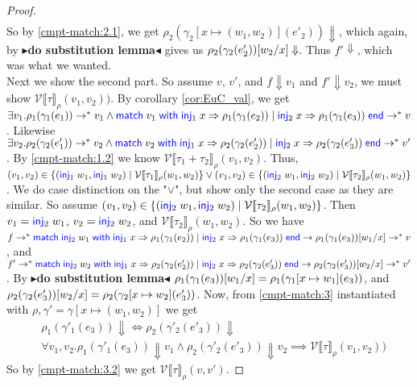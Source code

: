 \documentclass[twoside,11pt,openright]{report}
\theoremstyle{definition}
\newcommand{\Keyword}[1]{{\color{blue} \mathsf{#1}}}
\newcommand{\var}{x}
\newcommand{\expr}{e}
\newcommand{\val}{v}
\newcommand{\valB}{w}
\newcommand{\Inj}[1]{\Keyword{inj}_{#1}\;}
\newcommand{\MatchCmd}{\Keyword{match}}
\newcommand{\WithCmd}{\Keyword{with}}
\newcommand{\EndCmd}{\Keyword{end}}
\def\Match#1with#2=>#3|#4=>#5end{\MatchCmd{}\;#1\;\WithCmd{}\;#2\Rightarrow#3 \;|\;#4\Rightarrow#5\;\EndCmd{}}
\newcommand{\subst}[3]{#1{\left[#3 \middle/ #2 \right]}}
\newcommand{\Tsum}[2]{#1 + #2}
\newcommand{\typ}{\tau}
\newcommand{\step}{\rightarrow}
\newcommand{\stepS}{\rightarrow^*}
\newcommand{\ValInp}[2]{\mathcal{V} \llbracket #1 \rrbracket_{#2}}
\newcommand{\ValInpGen}[2]{\ValInp{#1}{#2}(\val_1, \val_2)}
\newcommand{\map}[2]{#1 \mapsto #2}
\newcommand{\todo}[1]{{\color[rgb]{.5,0,0}\textbf{$\blacktriangleright$#1$\blacktriangleleft$}}}
\begin{document}
\begin{proof}
\begin{align}
  \end{align}
  So by \ref{cmpt-match:2.1}, we get $\rho_2(\gamma_2[\map{\var}{(\valB_1, \valB_2)}](\expr'_2)) \Downarrow$, which again, by \todo{do substitution lemma} gives us $\subst{\rho_2(\gamma_2(\expr'_2))}{\var}{\valB_2} \Downarrow$. Thus $f' \Downarrow$, which was what we wanted.\\
  Next we show the second part. So assume $\val$, $\val'$, and $f \Downarrow \val_1$ and $f' \Downarrow \val_2$, we must show $\ValInpGen{\typ}{\rho})$. By corollary \ref{cor:EuC_val}, we get $\exists \val_1 . \rho_1(\gamma_1(\expr_1)) \stepS \val_1 \land \Match \val_1 with \Inj{1} \var => \rho_1(\gamma_1(\expr_2)) | \Inj{2} \var => \rho_1(\gamma_1(\expr_3)) end \stepS \val$. Likewise $\exists \val_2 . \rho_2(\gamma_2(\expr'_1)) \stepS \val_2 \land \Match \val_2 with \Inj{1} \var => \rho_2(\gamma_2(\expr'_2)) | \Inj{2} \var => \rho_2(\gamma_2(\expr'_3)) end \stepS \val'$. By \ref{cmpt-match:1.2} we know $\ValInp{\Tsum{\typ_1}{\typ_2}}{\rho}(\val_1, \val_2)$. Thus, 
  $(\val_1, \val_2) \in \{(\Inj{1} \valB_1, \Inj{1} \valB_2) \mid \ValInp{\typ_1}{\rho}(\valB_1, \valB_2)\} \lor
  (\val_1, \val_2) \in \{(\Inj{2} \valB_1, \Inj{2} \valB_2) \mid \ValInp{\typ_2}{\rho}(\valB_1, \valB_2)\}$. We do case distinction on the "$\lor$", but show only the second case as they are similar. So assume $(\val_1, \val_2) \in \{(\Inj{2} \valB_1, \Inj{2} \valB_2) \mid \ValInp{\typ_2}{\rho}(\valB_1, \valB_2)\}$. Then $\val_1 = \Inj{2} \valB_1$, $\val_2 = \Inj{2} \valB_2$, and $\ValInp{\typ_2}{\rho}(\valB_1, \valB_2)$. So we have\\ $f \stepS \Match \Inj{2} \valB_1 with \Inj{1} \var => \rho_1(\gamma_1(\expr_2)) | \Inj{2} \var => \rho_1(\gamma_1(\expr_3)) end \step \subst{\rho_1(\gamma_1(\expr_3))}{\var}{\valB_1} \stepS \val$, and\\
  $f' \stepS \Match \Inj{2} \valB_2 with \Inj{1} \var => \rho_2(\gamma_2(\expr'_2)) | \Inj{2} \var => \rho_2(\gamma_2(\expr'_3)) end \step \subst{\rho_2(\gamma_2(\expr'_3))}{\var}{\valB_2} \stepS \val'$. By \todo{do substitution lemma} $\subst{\rho_1(\gamma_1(\expr_3))}{\var}{\valB_1} = \rho_1(\gamma_1[\map{\var}{\valB_1}](\expr_3))$, and $\subst{\rho_2(\gamma_2(\expr'_3))}{\var}{\valB_2} = \rho_2(\gamma_2[\map{\var}{\valB_2}](\expr'_3))$.
  Now, from \ref{cmpt-match:3} instantiated with $\rho, \gamma' = \gamma[\map{\var}{(\valB_1, \valB_2)}]$ we get
  \begin{align}
    &\rho_1(\gamma'_1(\expr_3)) \Downarrow \iff \rho_2(\gamma'_2(\expr'_3)) \Downarrow\label{cmpt-match:3.1}\\
    &\forall \val_1, \val_2 . \rho_1(\gamma'_1(\expr_3)) \Downarrow \val_1 \land \rho_2(\gamma'_2(\expr'_3)) \Downarrow \val_2 \implies \ValInpGen{\typ}{\rho})\label{cmpt-match:3.2}
  \end{align}
  So by \ref{cmpt-match:3.2} we get $\ValInp{\typ}{\rho}(\val, \val')$.
\end{proof}
\end{document}
